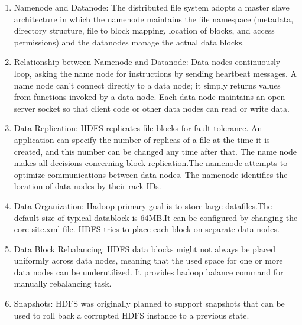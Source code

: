 \documentclass[12pt]{book}
\begin{document}
\begin{enumerate}
\item Namenode and Datanode:
The distributed file system adopts a master slave architecture in which
the namenode maintains the file namespace (metadata, directory structure, file to block
mapping, location of blocks, and access permissions) and the datanodes manage the actual data
blocks.
\item Relationship between Namenode and Datanode:
Data nodes continuously loop, asking the name node for instructions by sending heartbeat messages. 
A name node can't connect directly to a data node; it simply returns values from functions invoked by a data node.
Each data node maintains an open server socket so that client code or other data nodes can read or write data.

\item Data Replication:
HDFS replicates file blocks for fault tolerance. An application can specify the number of replicas of a file at the time it is created, and this number can be changed any time after that. 
The name node makes all decisions concerning block replication.The namenode attempts to optimize communications between data nodes. The namenode identifies the location of data nodes by their rack IDs. 

\item Data Organization:
Hadoop primary goal is to store large datafiles.The default size of typical datablock is 64MB.It can be configured by changing the core-site.xml file.
HDFS tries to place each block on separate data nodes.

\item Data Block Rebalancing:
HDFS data blocks might not always be placed uniformly across data nodes,
meaning that the used space for one or more data nodes can be underutilized.
It provides hadoop balance command for manually rebalancing task.

\item Snapshots:
HDFS was originally planned to support snapshots that can be used to roll back a corrupted HDFS instance to a previous state.
\end{enumerate}
\end{document}
